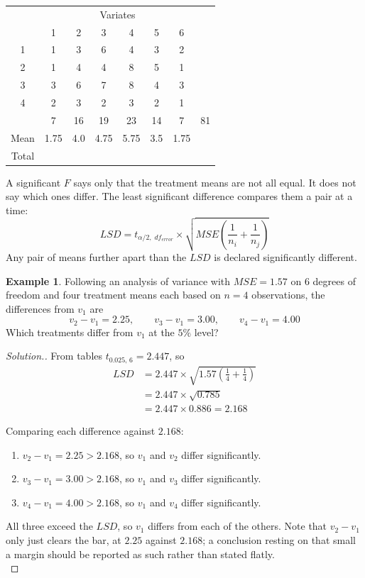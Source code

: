 \documentclass[11pt,a4paper]{article}
\theoremstyle{definition}
\newtheorem{example}[thm]{Example}
\newenvironment{solution}
  {\renewcommand{\qedsymbol}{}\begin{proof}[\textit{Solution}.]}
  {\end{proof}}
\begin{document}
\begin{table}[H]
\centering
\begin{tabular}{c|cccccc|c}
&\multicolumn{6}{c}{Variates}&\\
&1&2&3&4&5&6&\\
\hline
1&1&3&6&4&3&2&\\
2&1&4&4&8&5&1&\\
3&3&6&7&8&4&3&\\
4&2&3&2&3&2&1&\\
\hline
&7&16&19&23&14&7&81\\
Mean&1.75&4.0&4.75&5.75&3.5&1.75&\\
Total &&&&&&&\\
\end{tabular}
\end{table}
 

A significant $F$ says only that the treatment means are not all equal. It does not say
which ones differ. The least significant difference compares them a pair at a time:
\[LSD = t_{\alpha/2,\;df_{error}}\times\sqrt{MSE\left(\frac{1}{n_i}+\frac{1}{n_j}\right)}\]
Any pair of means further apart than the $LSD$ is declared significantly different.\\

\begin{example}
Following an analysis of variance with $MSE=1.57$ on $6$ degrees of freedom and four
treatment means each based on $n=4$ observations, the differences from $v_1$ are
\[v_2-v_1=2.25,\qquad  v_3-v_1=3.00,\qquad  v_4-v_1=4.00\]
Which treatments differ from $v_1$ at the $5\%$ level?\\
\end{example}

\begin{solution}
From tables $t_{0.025,\,6}=2.447$, so
\begin{align*}
LSD &= 2.447\times\sqrt{1.57\left(\frac{1}{4}+\frac{1}{4}\right)}\\[1ex]
    &= 2.447\times\sqrt{0.785}\\[1ex]
    &= 2.447\times 0.886 = 2.168
\end{align*}

Comparing each difference against $2.168$:
\begin{enumerate}
\item[] $v_2-v_1=2.25>2.168$, so $v_1$ and $v_2$ differ significantly.
\item[] $v_3-v_1=3.00>2.168$, so $v_1$ and $v_3$ differ significantly.
\item[] $v_4-v_1=4.00>2.168$, so $v_1$ and $v_4$ differ significantly.
\end{enumerate}

All three exceed the $LSD$, so $v_1$ differs from each of the others. Note that $v_2-v_1$
only just clears the bar, at $2.25$ against $2.168$; a conclusion resting on that small a
margin should be reported as such rather than stated flatly.\\[1ex] 
\end{solution}
\end{document}
